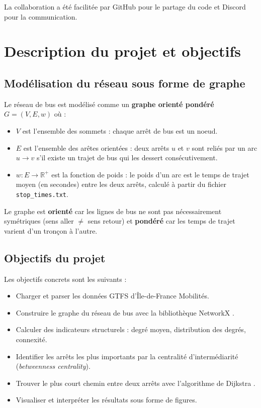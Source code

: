 \documentclass[a4paper, 12pt, twoside]{article}
\begin{document}
La collaboration a été facilitée par GitHub pour le partage du code et Discord pour la communication.

\section{Description du projet et objectifs}

	\subsection{Modélisation du réseau sous forme de graphe}

	Le réseau de bus est modélisé comme un \textbf{graphe orienté pondéré} $G = (V, E, w)$ où :
	\begin{itemize}
	    \item $V$ est l'ensemble des sommets : chaque arrêt de bus est un noeud.
	    \item $E$ est l'ensemble des arêtes orientées : deux arrêts $u$ et $v$ sont reliés par un arc $u \rightarrow v$ s'il existe un trajet de bus qui les dessert consécutivement.
	    \item $w : E \rightarrow \mathbb{R}^+$ est la fonction de poids : le poids d'un arc est le temps de trajet moyen (en secondes) entre les deux arrêts, calculé à partir du fichier \texttt{stop\_times.txt}.
	\end{itemize}

	Le graphe est \textbf{orienté} car les lignes de bus ne sont pas nécessairement symétriques (sens aller $\neq$ sens retour) et \textbf{pondéré} car les temps de trajet varient d'un tronçon à l'autre.

	\subsection{Objectifs du projet}

	Les objectifs concrets sont les suivants :
	\begin{itemize}
	    \item Charger et parser les données GTFS d'Île-de-France Mobilités.
	    \item Construire le graphe du réseau de bus avec la bibliothèque NetworkX \cite{NETWORKX}.
	    \item Calculer des indicateurs structurels : degré moyen, distribution des degrés, connexité.
	    \item Identifier les arrêts les plus importants par la centralité d'intermédiarité (\textit{betweenness centrality}).
	    \item Trouver le plus court chemin entre deux arrêts avec l'algorithme de Dijkstra \cite{DIJKSTRA}.
	    \item Visualiser et interpréter les résultats sous forme de figures.
	\end{itemize}
\end{document}
